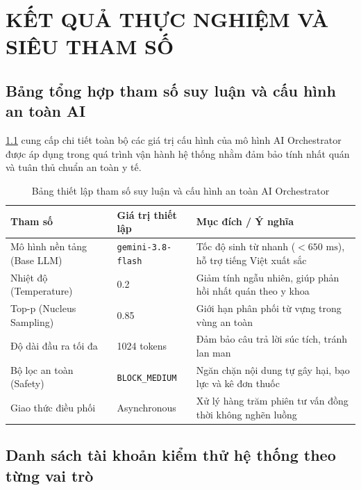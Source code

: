 
\chapter{KẾT QUẢ THỰC NGHIỆM VÀ SIÊU THAM SỐ}
\label{app:hyperparams}

\section{Bảng tổng hợp tham số suy luận và cấu hình an toàn AI}

\cref{tab:hyperparams} cung cấp chi tiết toàn bộ các giá trị cấu hình của mô hình AI Orchestrator được áp dụng trong quá trình vận hành hệ thống nhằm đảm bảo tính nhất quán và tuân thủ chuẩn an toàn y tế.

\begin{table}[htbp]
\centering
\caption{Bảng thiết lập tham số suy luận và cấu hình an toàn AI Orchestrator}
\label{tab:hyperparams}
\begin{tabularx}{\textwidth}{l l X}
    \toprule
    \textbf{Tham số} & \textbf{Giá trị thiết lập} & \textbf{Mục đích / Ý nghĩa} \\
    \midrule
    Mô hình nền tảng (Base LLM) & \texttt{gemini-3.8-flash} & Tốc độ sinh từ nhanh ($<650\text{ ms}$), hỗ trợ tiếng Việt xuất sắc \\
    Nhiệt độ (Temperature)     & 0.2                       & Giảm tính ngẫu nhiên, giúp phản hồi nhất quán theo y khoa \\
    Top-p (Nucleus Sampling)    & 0.85                      & Giới hạn phân phối từ vựng trong vùng an toàn \\
    Độ dài đầu ra tối đa        & 1024 tokens               & Đảm bảo câu trả lời súc tích, tránh lan man \\
    Bộ lọc an toàn (Safety)    & \texttt{BLOCK\_MEDIUM}    & Ngăn chặn nội dung tự gây hại, bạo lực và kê đơn thuốc \\
    Giao thức điều phối         & Asynchronous              & Xử lý hàng trăm phiên tư vấn đồng thời không nghẽn luồng \\
    \bottomrule
\end{tabularx}
\end{table}

\section{Danh sách tài khoản kiểm thử hệ thống theo từng vai trò}

